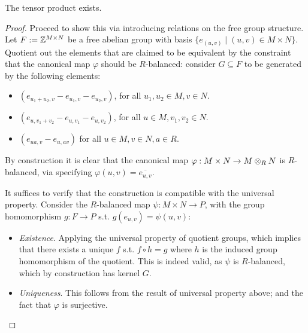 \begin{proposition}
    The tensor product exists.
\end{proposition}

\begin{proof}
    Proceed to show this via introducing relations on the free group structure. Let $F := \mathbb{Z}^{M \times N}$ be a free abelian group with basis $\{ e_{(u, v)} \mid (u, v) \in M \times N \}$. Quotient out the elements that are claimed to be equivalent by the constraint that the canonical map $\varphi$ should be $R$-balanced: consider $G \subseteq F$ to be generated by the following elements:
    \begin{itemize}
        \item $(e_{u_1 + u_2, v} - e_{u_1, v} - e_{u_2, v})$, for all $u_1, u_2 \in M, v \in N$.
        \item $(e_{u, v_1 + v_2} - e_{u, v_1} - e_{u, v_2})$, for all $u \in M, v_1, v_2 \in N$.
        \item $(e_{ua, v} - e_{u, av})$ for all $u \in M, v \in N, a \in R$.
    \end{itemize}
    By construction it is clear that the canonical map $\varphi: M \times N \to M \otimes_R N$ is $R$-balanced, via specifying $\varphi(u, v) = \overline{e_{u, v}}$. 

    It suffices to verify that the construction is compatible with the universal property. Consider the $R$-balanced map $\psi: M \times N \to P$, with the group homomorphism $g: F \to P$ s.t. $g(e_{u, v}) = \psi(u, v)$:
    \begin{figure}[htbp]
        \centering
    \end{figure}
    \begin{itemize}
        \item \emph{Existence}. Applying the universal property of quotient groups, which implies that there exists a unique $f$ s.t. $f \circ h = g$ where $h$ is the induced group homomorphism of the quotient. This is indeed valid, as $\psi$ is $R$-balanced, which by construction has kernel $G$.
        \item \emph{Uniqueness}. This follows from the result of universal property above; and the fact that $\varphi$ is surjective.
    \end{itemize}
\end{proof}

